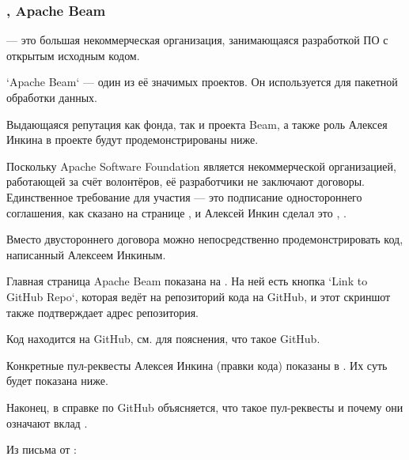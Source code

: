 \subsubsection{\Asf, Apache Beam}
\label{subsubsec:RoleApache}


\Asf — это большая некоммерческая организация, занимающаяся разработкой ПО с открытым исходным кодом.

`Apache Beam` — один из её значимых проектов.
Он используется для пакетной обработки данных.

Выдающаяся репутация как фонда, так и проекта Beam, а также роль Алексея Инкина в проекте будут продемонстрированы ниже.


Поскольку Apache Software Foundation является некоммерческой организацией, работающей за счёт волонтёров,
её разработчики не заключают договоры.
Единственное требование для участия — это подписание одностороннего соглашения,
как сказано на странице ,
и Алексей Инкин сделал это , .

Вместо двустороннего договора можно непосредственно продемонстрировать код, написанный Алексеем Инкиным.

Главная страница Apache Beam показана на .
На ней есть кнопка `Link to GitHub Repo`, которая ведёт на репозиторий кода на GitHub,
и этот скриншот также подтверждает адрес репозитория.

Код находится на GitHub, см.  для пояснения, что такое GitHub.

Конкретные пул-реквесты Алексея Инкина (правки кода) показаны в .
Их суть будет показана ниже.

Наконец, в справке по GitHub объясняется, что такое пул-реквесты и почему они означают вклад .



Из письма от \MrApacheT:

